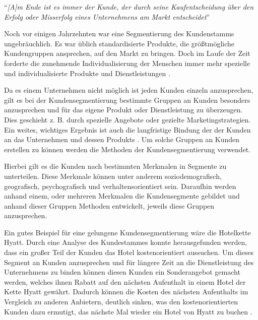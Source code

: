 \begin{refsection}
  
  \enquote{\textit{[A]m Ende ist es immer der Kunde, der durch seine Kaufentscheidung über den Erfolg oder Misserfolg eines Unternehmens am Markt entscheidet}} \autocite[76]{herp1990anders}
  
  Noch vor einigen Jahrzehnten war eine Segmentierung des Kundenstamms ungebräuchlich. Es war üblich standardisierte Produkte, die grö\ss{}tmögliche Kundengruppen ansprechen, auf den Markt zu bringen. Doch im Laufe der Zeit forderte die zunehmende Individualisierung der Menschen immer mehr spezielle und individualisierte Produkte und Dienstleistungen \autocite[1]{Rudolph2009}.

Da es einem Unternehmen nicht möglich ist jeden Kunden einzeln anzusprechen, gilt es bei der Kundensegmentierung bestimmte Gruppen an Kunden besonders anzusprechen und für das eigene Produkt oder Dienstleistung zu  überzeugen. Dies geschieht z. B. durch spezielle Angebote oder gezielte Marketingstrategien. Ein weites, wichtiges Ergebnis ist auch die langfristige Bindung der der Kunden an das Unternehmen und dessen Produkts \autocite[1]{Rudolph2009}. Um solche Gruppen an Kunden erstellen zu können werden die Methoden der Kundensegmentierung verwendet.

Hierbei gilt es die Kunden nach bestimmten Merkmalen in Segmente zu unterteilen. Diese Merkmale können unter anderem soziodemografisch, geografisch, psychografisch und verhaltensorientiert sein. Daraufhin werden anhand einem, oder mehreren Merkmalen die Kundensegmente gebildet und anhand dieser Gruppen Methoden entwickelt, jeweils diese Gruppen anzusprechen. 

Ein gutes Beispiel für eine gelungene Kundensegmentierung wäre die Hotelkette Hyatt. Durch eine Analyse des Kundestammes konnte herausgefunden werden, dass ein gro\ss{}er Teil der Kunden das Hotel kostenorientiert aussuchen. Um dieses Segment an Kunden anzusprechen und für längere Zeit an die Dienstleistung des Unternehmens zu binden können diesen Kunden ein Sonderangebot gemacht werden, welches ihnen Rabatt auf den nächsten Aufenthalt in einem Hotel der Kette Hyatt gewährt. Dadurch können die Kosten des nächsten Aufenthalts im Vergleich zu anderen Anbietern, deutlich sinken, was den kostenorientierten Kunden dazu ermutigt, das nächste Mal wieder ein Hotel von {Hyatt} zu buchen \autocite[4-7]{dissertationprime2015}.
  \clearpage
  \printbibliography[heading=subsubbibliography]
\end{refsection}
\clearpage
